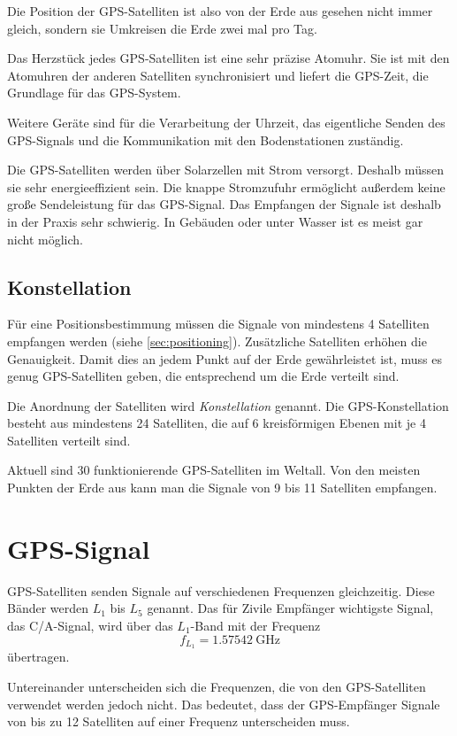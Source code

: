 \documentclass[12pt,a4paper]{scrartcl}
\begin{document}
Die Position der GPS-Satelliten ist also von der Erde aus gesehen nicht immer gleich, sondern sie Umkreisen die Erde zwei mal pro Tag.

Das Herzstück jedes GPS-Satelliten ist eine sehr präzise Atomuhr. Sie ist mit den Atomuhren der anderen Satelliten synchronisiert und liefert die GPS-Zeit, die Grundlage für das GPS-System.

Weitere Geräte sind für die Verarbeitung der Uhrzeit, das eigentliche Senden des GPS-Signals und die Kommunikation mit den Bodenstationen zuständig.

Die GPS-Satelliten werden über Solarzellen mit Strom versorgt. Deshalb müssen sie sehr energieeffizient sein. Die knappe Stromzufuhr ermöglicht außerdem keine große Sendeleistung für das GPS-Signal. Das Empfangen der Signale ist deshalb in der Praxis sehr schwierig. In Gebäuden oder unter Wasser ist es meist gar nicht möglich.

\subsection{Konstellation}
Für eine Positionsbestimmung müssen die Signale von mindestens 4 Satelliten empfangen werden (siehe \ref{sec:positioning}). Zusätzliche Satelliten erhöhen die Genauigkeit. Damit dies an jedem Punkt auf der Erde gewährleistet ist, muss es genug GPS-Satelliten geben, die entsprechend um die Erde verteilt sind.

Die Anordnung der Satelliten wird \emph{Konstellation} genannt. Die GPS-Konstellation besteht aus mindestens 24 Satelliten, die auf 6 kreisförmigen Ebenen mit je 4 Satelliten verteilt sind.

Aktuell sind 30 funktionierende GPS-Satelliten im Weltall. Von den meisten Punkten der Erde aus kann man die Signale von 9 bis 11 Satelliten empfangen.

\section{GPS-Signal}
GPS-Satelliten senden Signale auf verschiedenen Frequenzen gleichzeitig. Diese Bänder werden $L_1$ bis $L_5$ genannt. Das für Zivile Empfänger wichtigste Signal, das C/A-Signal, wird über das $L_1$-Band mit der Frequenz
\begin{equation}
f_{L_1} = \SI{1.57542}{\giga\hertz} \nonumber
\end{equation}
übertragen.

Untereinander unterscheiden sich die Frequenzen, die von den GPS-Satelliten verwendet werden jedoch nicht. Das bedeutet, dass der GPS-Empfänger Signale von bis zu 12 Satelliten auf einer Frequenz unterscheiden muss.
\end{document}

